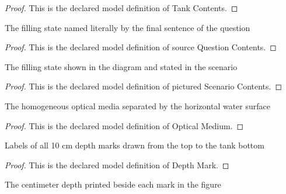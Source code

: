 \begin{proof}
  This is the declared model definition of Tank Contents.
\end{proof}
\begin{definition}
  \label{def:physics:phyx-mini-0071:phyxminiproblems-problemphyxmini0071-sourcequestioncontents}
  The filling state named literally by the final sentence of the question
\end{definition}
\begin{proof}
  This is the declared model definition of source Question Contents.
\end{proof}
\begin{definition}
  \label{def:physics:phyx-mini-0071:phyxminiproblems-problemphyxmini0071-picturedscenariocontents}
  The filling state shown in the diagram and stated in the scenario
\end{definition}
\begin{proof}
  This is the declared model definition of pictured Scenario Contents.
\end{proof}
\begin{definition}
  \label{def:physics:phyx-mini-0071:phyxminiproblems-problemphyxmini0071-opticalmedium}
  The homogeneous optical media separated by the horizontal water surface
\end{definition}
\begin{proof}
  This is the declared model definition of Optical Medium.
\end{proof}
\begin{definition}
  \label{def:physics:phyx-mini-0071:phyxminiproblems-problemphyxmini0071-depthmark}
  Labels of all 10 cm depth marks drawn from the top to the tank bottom
\end{definition}
\begin{proof}
  This is the declared model definition of Depth Mark.
\end{proof}
\begin{definition}
  \label{def:physics:phyx-mini-0071:phyxminiproblems-problemphyxmini0071-depthmarkcentimeters}
  The centimeter depth printed beside each mark in the figure
\end{definition}

